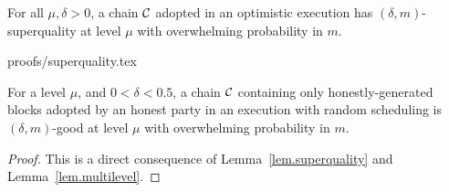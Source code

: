 \begin{lemma}[Superquality]
\label{lem.superquality}
For all $\mu, \delta > 0$, a chain $\mathcal{C}$ adopted in an optimistic execution
has $(\delta, m)$-superquality at level $\mu$ with overwhelming probability in
$m$.
\end{lemma}
{proofs/superquality.tex}

\begin{lemma}
\label{lem.superchain-distribution}
For a level $\mu$, and $0 < \delta < 0.5$, a chain
$\mathcal{C}$ containing only honestly-generated blocks adopted by an honest party in
an execution with random scheduling is $(\delta, m)$-good at level
$\mu$ with overwhelming probability in $m$.
\end{lemma}
\ifonecolumn
\begin{proof}
This is a direct consequence of Lemma~\ref{lem.superquality} and
Lemma~\ref{lem.multilevel}. \Qed
\end{proof}
\fi
